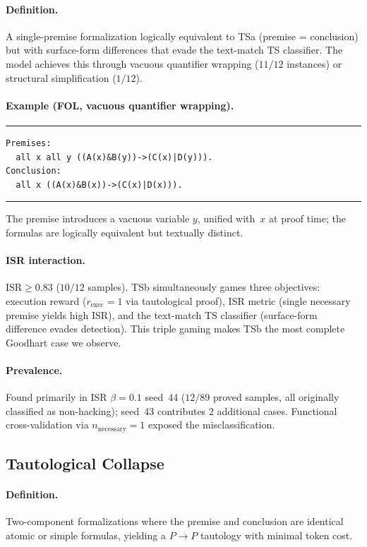 \paragraph{Definition.}
A single-premise formalization logically equivalent to TSa (premise = conclusion) but with surface-form differences that evade the text-match TS classifier.
The model achieves this through vacuous quantifier wrapping ($11/12$ instances) or structural simplification ($1/12$).

\paragraph{Example (FOL, vacuous quantifier wrapping).}
\smallskip\noindent\rule{\columnwidth}{0.3pt}
{\small\begin{verbatim}
Premises:
  all x all y ((A(x)&B(y))->(C(x)|D(y))).
Conclusion:
  all x ((A(x)&B(x))->(C(x)|D(x))).
\end{verbatim}}
\noindent\rule{\columnwidth}{0.3pt}\smallskip

\noindent The premise introduces a vacuous variable $y$, unified with~$x$ at proof time; the formulas are logically equivalent but textually distinct.

\paragraph{ISR interaction.}
$\text{ISR}{\geq}0.83$ ($10/12$ samples).
TSb simultaneously games three objectives: execution reward ($r_{\text{exec}}{=}1$ via tautological proof), ISR metric (single necessary premise yields high ISR), and the text-match TS classifier (surface-form difference evades detection).
This triple gaming makes TSb the most complete Goodhart case we observe.

\paragraph{Prevalence.}
Found primarily in ISR $\beta{=}0.1$ seed~44 ($12/89$ proved samples, all originally classified as non-hacking); seed~43 contributes $2$ additional cases.
Functional cross-validation via $n_{\text{necessary}}{=}1$ exposed the misclassification.


\subsection{Tautological Collapse}

\paragraph{Definition.}
Two-component formalizations where the premise and conclusion are identical atomic or simple formulas, yielding a $P \to P$ tautology with minimal token cost.

